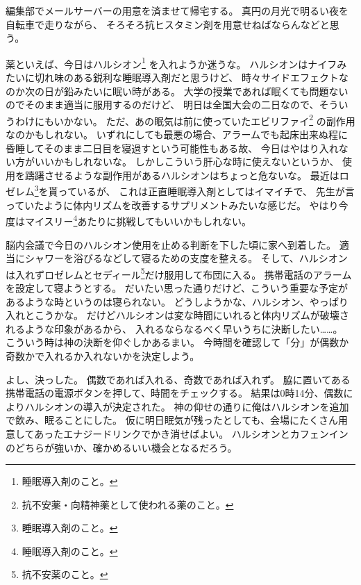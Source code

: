 編集部でメールサーバーの用意を済ませて帰宅する。
真円の月光で明るい夜を自転車で走りながら、
そろそろ抗ヒスタミン剤を用意せねばならんなどと思う。

薬といえば、今日はハルシオン\footnote{睡眠導入剤のこと。}%
を入れようか迷うな。
ハルシオンはナイフみたいに切れ味のある鋭利な睡眠導入剤だと思うけど、
時々サイドエフェクトなのか次の日が鉛みたいに眠い時がある。
大学の授業であれば眠くても問題ないのでそのまま適当に服用するのだけど、
明日は全国大会の二日なので、そういうわけにもいかない。
ただ、あの眠気は前に使っていたエビリファイ\footnote{抗不安薬・向精神薬として使われる薬のこと。}%
の副作用なのかもしれない。
いずれにしても最悪の場合、アラームでも起床出来ぬ程に昏睡してそのまま二日目を寝過すという可能性もある故、
今日はやはり入れない方がいいかもしれないな。
しかしこういう肝心な時に使えないというか、
使用を躊躇させるような副作用があるハルシオンはちょっと危ないな。
最近はロゼレム\footnote{睡眠導入剤のこと。}を貰っているが、
これは正直睡眠導入剤としてはイマイチで、
先生が言っていたように体内リズムを改善するサプリメントみたいな感じだ。
やはり今度はマイスリー\footnote{睡眠導入剤のこと。}あたりに挑戦してもいいかもしれない。

脳内会議で今日のハルシオン使用を止める判断を下した頃に家へ到着した。
適当にシャワーを浴びるなどして寝るための支度を整える。
そして、ハルシオンは入れずロゼレムとセディール\footnote{抗不安薬のこと。}だけ服用して布団に入る。
携帯電話のアラームを設定して寝ようとする。
だいたい思った通りだけど、こういう重要な予定があるような時というのは寝られない。
どうしようかな、ハルシオン、やっぱり入れとこうかな。
だけどハルシオンは変な時間にいれると体内リズムが破壊されるような印象があるから、
入れるならなるべく早いうちに決断したい……。
こういう時は神の決断を仰ぐしかあるまい。
今時間を確認して「分」が偶数か奇数かで入れるか入れないかを決定しよう。

よし、決っした。
偶数であれば入れる、奇数であれば入れず。
脇に置いてある携帯電話の電源ボタンを押して、時間をチェックする。
結果は0時14分、偶数によりハルシオンの導入が決定された。
神の仰せの通りに俺はハルシオンを追加で飲み、眠ることにした。
仮に明日眠気が残ったとしても、会場にたくさん用意してあったエナジードリンクでかき消せばよい。
ハルシオンとカフェンインのどちらが強いか、確かめるいい機会となるだろう。
